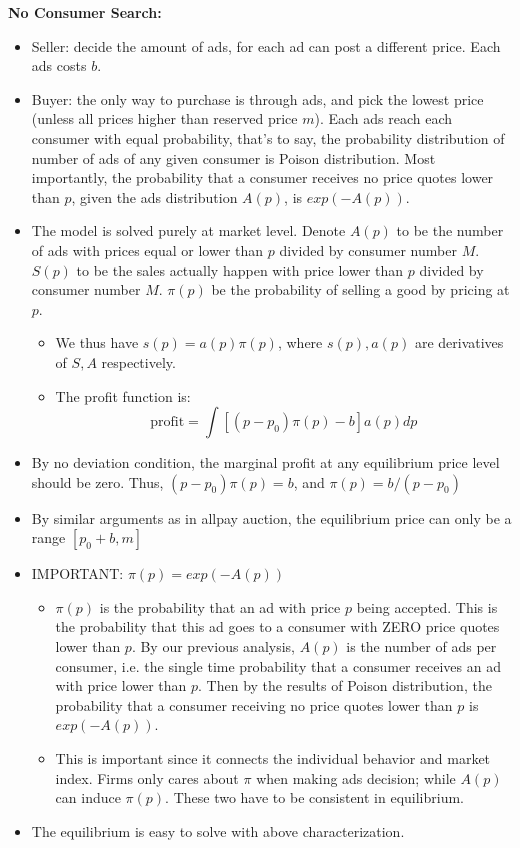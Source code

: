 \documentclass{book}
\theoremstyle{plain}
\theoremstyle{definition}
\begin{document}
\vspace{1em}
\noindent
\textbf{No Consumer Search:}
\begin{itemize}
	\item Seller: decide the amount of ads, for each ad can post a different price. Each ads costs $b$.
	\item Buyer: the only way to purchase is through ads, and pick the lowest price (unless all prices higher than reserved price $m$). Each ads reach each consumer with equal probability, that's to say, the probability distribution of number of ads of any given consumer is Poison distribution. Most importantly, the probability that a consumer receives no price quotes lower than $p$, given the ads distribution $A(p)$, is $exp(-A(p))$.
	\item The model is solved purely at market level. Denote $A(p)$ to be the number of ads with prices equal or lower than $p$ divided by consumer number $M$. $S(p)$ to be the sales actually happen with price lower than $p$ divided by consumer number $M$. $\pi(p)$ be the probability of selling a good by pricing at $p$.
	\begin{itemize}
		\item We thus have $s(p)=a(p)\pi(p)$, where $s(p),a(p)$ are derivatives of $S,A$ respectively.
		\item The profit function is:
		\[\text{profit}=\int{[(p-p_0)\pi(p)-b]a(p)}dp\]
	\end{itemize}
	\item By no deviation condition, the marginal profit at any equilibrium price level should be zero. Thus, $(p-p_0)\pi(p)=b$, and $\pi(p)=b/(p-p_0)$
	\item By similar arguments as in allpay auction, the equilibrium price can only be a range $[p_0+b,m]$
	\item IMPORTANT: $\pi(p)=exp(-A(p))$
	\begin{itemize}
		\item $\pi(p)$ is the probability that an ad with price $p$ being accepted. This is the probability that this ad goes to a consumer with ZERO price quotes lower than $p$. By our previous analysis, $A(p)$ is the number of ads per consumer, i.e. the single time probability that a consumer receives an ad with price lower than $p$. Then by the results of Poison distribution, the probability that a consumer receiving no price quotes lower than $p$ is $exp(-A(p))$.
		\item This is important since it connects the individual behavior and market index. Firms only cares about $\pi$ when making ads decision; while $A(p)$ can induce $\pi(p)$. These two have to be consistent in equilibrium.
	\end{itemize}
	\item The equilibrium is easy to solve with above characterization.
\end{itemize}
\end{document}
